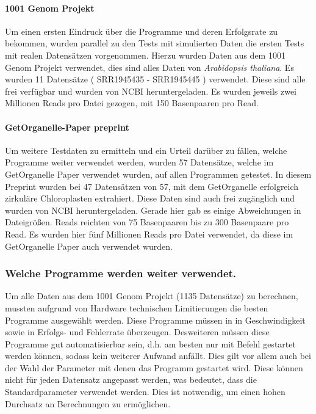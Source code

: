 \documentclass{scrartcl}
\begin{document}
\paragraph{1001 Genom Projekt}
\label{sec-3-2-1-2}
Um einen ersten Eindruck über die Programme und deren Erfolgsrate zu bekommen, wurden parallel zu den Tests mit simulierten Daten die ersten Tests mit realen Datensätzen vorgenommen. 
Hierzu wurden Daten aus dem 1001 Genom Projekt\footnotemark[46]{} verwendet, dies sind alles Daten von \emph{Arabidopsis thaliana}. Es wurden 11 Datensätze ( SRR1945435 - SRR1945445 ) verwendet. Diese sind alle
frei verfügbar und wurden von NCBI\footnotemark[38]{} heruntergeladen. Es wurden jeweils zwei Millionen Reads pro Datei gezogen, mit 150 Basenpaaren pro Read. 

\paragraph{GetOrganelle-Paper preprint}
\label{sec-3-2-1-3}
Um weitere Testdaten zu ermitteln und ein Urteil darüber zu fällen, welche Programme weiter verwendet werden,
wurden 57 Datensätze, welche im GetOrganelle Paper \footnotemark[32]{} verwendet wurden,
auf allen Programmen getestet. In diesem Preprint wurden bei 47 Datensätzen von 57, mit
dem GetOrganelle erfolgreich zirkuläre Chloroplasten extrahiert. Diese Daten sind auch frei zugänglich und wurden
von NCBI heruntergeladen. Gerade hier gab es einige Abweichungen in Dateigrößen. Reads reichten von 75 Basenpaaren 
bis zu 300 Basenpaare pro Read. Es wurden hier fünf Millionen Reads pro Datei verwendet, da diese im GetOrganelle Paper
auch verwendet wurden.

\subsubsection{Welche Programme werden weiter verwendet.}
\label{sec-3-2-2}
Um alle Daten aus dem 1001 Genom Projekt (1135 Datensätze) zu berechnen, mussten aufgrund 
von Hardware technischen Limitierungen die besten Programme ausgewählt werden. Diese Programme müssen in
in Geschwindigkeit sowie in Erfolgs- und Fehlerrate überzeugen. Desweiteren müssen diese Programme gut automatisierbar sein, 
d.h. am besten nur mit Befehl gestartet werden können, sodass kein weiterer Aufwand anfällt. Dies gilt
vor allem auch bei der Wahl der Parameter mit denen das Programm gestartet wird. Diese können nicht 
für jeden Datensatz angepasst werden, was bedeutet, dass die Standardparameter verwendet werden.
Dies ist notwendig, um einen hohen Durchsatz an Berechnungen zu ermöglichen.
\end{document}
